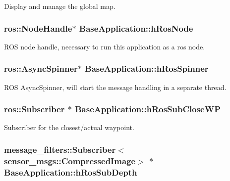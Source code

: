 \-Display and manage the global map. \hypertarget{classBaseApplication_a35b356ea9b074e3f5f1e0b5e66800194}{
\subsubsection[{h\-Ros\-Node}]{\setlength{\rightskip}{0pt plus 5cm}ros\-::\-Node\-Handle$\ast$ {\bf \-Base\-Application\-::h\-Ros\-Node}}}\label{classBaseApplication_a35b356ea9b074e3f5f1e0b5e66800194}
\-R\-O\-S node handle, necessary to run this application as a ros node. \hypertarget{classBaseApplication_abbd36e6d2077310432b8c4f33df7383a}{
\subsubsection[{h\-Ros\-Spinner}]{\setlength{\rightskip}{0pt plus 5cm}ros\-::\-Async\-Spinner$\ast$ {\bf \-Base\-Application\-::h\-Ros\-Spinner}}}\label{classBaseApplication_abbd36e6d2077310432b8c4f33df7383a}
\-R\-O\-S \-Async\-Spinner, will start the message handling in a separate thread. \hypertarget{classBaseApplication_a244ec7daa7f9247b9121a742b302905c}{
\subsubsection[{h\-Ros\-Sub\-Close\-W\-P}]{\setlength{\rightskip}{0pt plus 5cm}ros\-::\-Subscriber $\ast$ {\bf \-Base\-Application\-::h\-Ros\-Sub\-Close\-W\-P}}}\label{classBaseApplication_a244ec7daa7f9247b9121a742b302905c}
\-Subscriber for the closest/actual waypoint. \hypertarget{classBaseApplication_a4a3265b7368e09d95ebaeab383a3d4a5}{
\subsubsection[{h\-Ros\-Sub\-Depth}]{\setlength{\rightskip}{0pt plus 5cm}message\-\_\-filters\-::\-Subscriber$<$sensor\-\_\-msgs\-::\-Compressed\-Image$>$ $\ast$ {\bf \-Base\-Application\-::h\-Ros\-Sub\-Depth}}}\label{classBaseApplication_a4a3265b7368e09d95ebaeab383a3d4a5}
